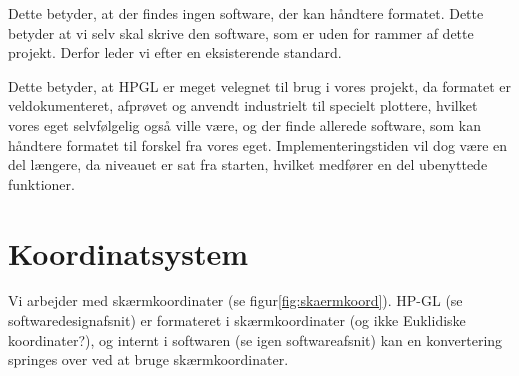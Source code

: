Dette betyder, at der findes ingen software, der kan håndtere
formatet. Dette betyder at vi selv skal skrive den software, som er
uden for rammer af dette projekt. Derfor leder vi efter en
eksisterende standard.


Dette betyder, at HPGL er meget velegnet til brug i vores projekt, da
formatet er veldokumenteret, afprøvet og anvendt industrielt til
specielt plottere, hvilket vores eget selvfølgelig også ville være, og
der finde allerede software, som kan håndtere formatet til forskel fra
vores eget. Implementeringstiden vil dog være en del længere, da
niveauet er sat fra starten, hvilket medfører en del ubenyttede
funktioner.


\section{Koordinatsystem}


Vi arbejder med skærmkoordinater (se
figur\vref{fig:skaermkoord}). HP-GL (se
softwaredesignafsnit) er formateret i
skærmkoordinater (og ikke Euklidiske koordinater?),
og internt i softwaren (se igen
softwareafsnit) kan en konvertering
springes over ved at bruge skærmkoordinater.



